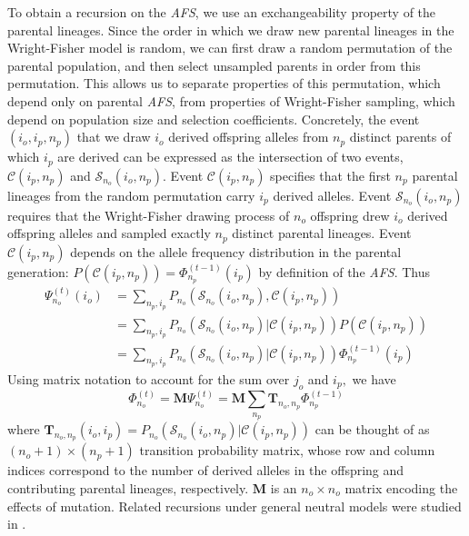 \documentclass[9pt,twocolumn,twoside,lineno]{gsajnl}
\newcommand{\afs}[2]{\Phi_{#1}^{(#2)}}
\newcommand{\afsPsi}[2]{\Psi_{#1}^{(#2)}}
\begin{document}
To obtain a recursion on the
\textit{AFS}, we use an exchangeability property of the parental lineages. Since the order in which we
draw new parental lineages in the Wright-Fisher model is random, we can first draw a random permutation 
of the parental population, and then select unsampled parents in order from this permutation. 
This allows us to separate properties of this permutation,
which depend only on parental \textit{AFS}, from properties of Wright-Fisher sampling, which depend
on population size and selection coefficients. Concretely, the event $(i_o,i_p,n_p)$ that we draw
$i_o$ derived offspring alleles from $n_p$ distinct parents of which $i_p$ are derived can be
expressed as the intersection of two events, $\mathcal{C}(i_p,n_p)$ and $\mathcal{S}_{n_o}(i_o,
n_p)$. Event $\mathcal{C}(i_p,n_p)$ specifies that the first $n_p$ parental lineages from the random
permutation carry $i_p$ derived alleles. Event $\mathcal{S}_{n_o}(i_o, n_p)$ requires that the
Wright-Fisher drawing process of $n_o$ offspring drew $i_o$ derived offspring alleles and sampled
exactly $n_p$ distinct parental lineages. Event $\mathcal{C}(i_p, n_p)$ depends on the allele
frequency distribution in the parental generation: $P(\mathcal{C}(i_p,n_p)) =\afs{n_p}{t-1} (i_p)$ by
definition of the \textit{AFS}. Thus
\begin{equation}
  \begin{split}
    \afsPsi{n_o}{t}(i_o)&= \sum_{n_p,i_p} P_{n_o}(\mathcal{S}_{n_o}(i_o, n_p), \mathcal{C}(i_p,n_p) )\\
    &=   \sum_{n_p,i_p} P_{n_o}(\mathcal{S}_{n_o}(i_o, n_p)| \mathcal{C}(i_p,n_p) ) P(\mathcal{C}(i_p,n_p))\\
    &=   \sum_{n_p,i_p} P_{n_o}(\mathcal{S}_{n_o}(i_o, n_p)| \mathcal{C}(i_p,n_p) )  \afs{n_p}{t-1}(i_p)%
  \end{split}
\end{equation}
Using matrix notation to account for the sum over $j_o$ and $i_p,$ we have
\begin{equation}
  \afs{n_o}{t} = \mathbf{M}  \afsPsi{n_o}{t} =  \mathbf{M}  \sum_{n_p}  \mathbf{T}_{n_o,n_p}     \afs{n_p}{t-1}
    \label{eq_recur}
  \end{equation}
where $\mathbf{T}_{n_o,n_p}(i_o,i_p) = P_{n_o}(\mathcal{S}_{n_o}(i_o, n_p)| \mathcal{C}(i_p,n_p) ) $ 
can be thought of as $(n_o+1) \times (n_p+1)$ transition
probability matrix, whose row and column indices correspond to the number of derived alleles in the
offspring and contributing parental lineages, respectively. $\mathbf{M}$ is an $n_o\times n_o$ matrix encoding the effects of mutation. Related recursions under general neutral 
models were studied in \cite{Lessard2010}.
\end{document}
